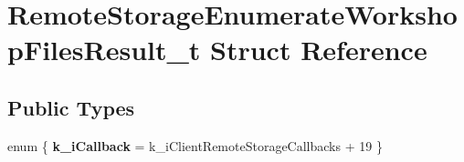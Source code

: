 \hypertarget{structRemoteStorageEnumerateWorkshopFilesResult__t}{}\section{Remote\+Storage\+Enumerate\+Workshop\+Files\+Result\+\_\+t Struct Reference}
\label{structRemoteStorageEnumerateWorkshopFilesResult__t}
\subsection*{Public Types}
\begin{DoxyCompactItemize}
\item 
\hypertarget{structRemoteStorageEnumerateWorkshopFilesResult__t_abd3a5b71d5a330ef0baa7729d0148a80}{}enum \{ {\bfseries k\+\_\+i\+Callback} = k\+\_\+i\+Client\+Remote\+Storage\+Callbacks + 19
 \}\label{structRemoteStorageEnumerateWorkshopFilesResult__t_abd3a5b71d5a330ef0baa7729d0148a80}

\end{DoxyCompactItemize}
